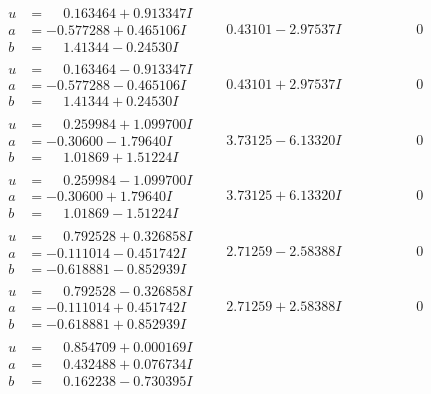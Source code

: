 \documentclass[1p]{elsarticle_modified}
\theoremstyle{definition}
\begin{document}
$$\begin{array}{c|c|c}
\begin{aligned}
u &= \phantom{-}0.163464 + 0.913347 I \\
a &= -0.577288 + 0.465106 I \\
b &= \phantom{-}1.41344 - 0.24530 I\end{aligned}
 & \phantom{-}0.43101 - 2.97537 I & \phantom{-0.000000 } 0 \\ \hline\begin{aligned}
u &= \phantom{-}0.163464 - 0.913347 I \\
a &= -0.577288 - 0.465106 I \\
b &= \phantom{-}1.41344 + 0.24530 I\end{aligned}
 & \phantom{-}0.43101 + 2.97537 I & \phantom{-0.000000 } 0 \\ \hline\begin{aligned}
u &= \phantom{-}0.259984 + 1.099700 I \\
a &= -0.30600 - 1.79640 I \\
b &= \phantom{-}1.01869 + 1.51224 I\end{aligned}
 & \phantom{-}3.73125 - 6.13320 I & \phantom{-0.000000 } 0 \\ \hline\begin{aligned}
u &= \phantom{-}0.259984 - 1.099700 I \\
a &= -0.30600 + 1.79640 I \\
b &= \phantom{-}1.01869 - 1.51224 I\end{aligned}
 & \phantom{-}3.73125 + 6.13320 I & \phantom{-0.000000 } 0 \\ \hline\begin{aligned}
u &= \phantom{-}0.792528 + 0.326858 I \\
a &= -0.111014 - 0.451742 I \\
b &= -0.618881 - 0.852939 I\end{aligned}
 & \phantom{-}2.71259 - 2.58388 I & \phantom{-0.000000 } 0 \\ \hline\begin{aligned}
u &= \phantom{-}0.792528 - 0.326858 I \\
a &= -0.111014 + 0.451742 I \\
b &= -0.618881 + 0.852939 I\end{aligned}
 & \phantom{-}2.71259 + 2.58388 I & \phantom{-0.000000 } 0 \\ \hline\begin{aligned}
u &= \phantom{-}0.854709 + 0.000169 I \\
a &= \phantom{-}0.432488 + 0.076734 I \\
b &= \phantom{-}0.162238 - 0.730395 I\end{aligned}

\end{array}$$
\end{document}
